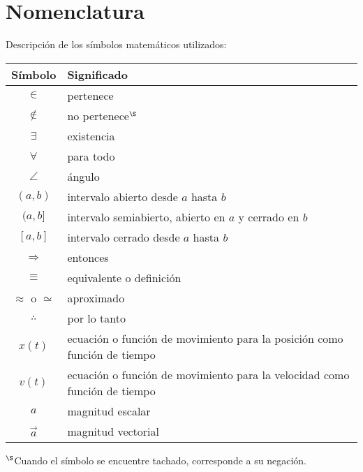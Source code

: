 \clearpage

\chapter{Nomenclatura}

Descripción de los símbolos matemáticos utilizados:

\begin{table}[!ht]
  \centering
  \begin{tabular}{cl}
    \hline\hline
    Símbolo & Significado \\
    \hline
    $\in$ & pertenece \\
    $\notin$ & no pertenece$^\S$ \\
    $\exists$ & existencia \\
    $\forall$ & para todo \\
    $\angle$ & ángulo \\
    $(a,b)$ & intervalo abierto desde $a$ hasta $b$ \\
    $(a,b]$ &  intervalo semiabierto, abierto en $a$ y cerrado en $b$ \\
    $[a,b]$ & intervalo cerrado desde $a$ hasta $b$  \\
    $\Rightarrow$ & entonces \\
    \(\equiv \) & equivalente o definición \\
    \(\approx \) o \( \simeq \) & aproximado \\
    \(\therefore\) & por lo tanto \\
    \( x(t) \) & ecuación o función de movimiento para la posición como función
    de tiempo \\
    \( v(t) \) & ecuación o función de movimiento para la velocidad como
    función de tiempo \\
    $a$ & magnitud escalar \\
    $\vec{a}$ & magnitud vectorial \\
    \hline\hline
  \end{tabular}
\end{table}
$^\S$Cuando el símbolo se encuentre tachado, corresponde a su negación.
